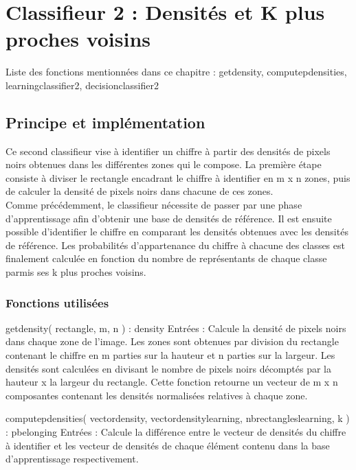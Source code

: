 \section{Classifieur 2 : Densités et K plus proches voisins}
Liste des fonctions mentionnées dans ce chapitre : getdensity, computepdensities, learningclassifier2, decisionclassifier2

\subsection{Principe et implémentation}

Ce second classifieur vise à identifier un chiffre à partir des densités de pixels noirs obtenues dans les différentes zones qui le compose. La première étape consiste à diviser le rectangle encadrant le chiffre à identifier en m x n zones, puis de calculer la densité de pixels noirs dans chacune de ces zones.\\

Comme précédemment, le classifieur nécessite de passer par une phase d'apprentissage afin d'obtenir une base de densités de référence. Il est ensuite possible d'identifier le chiffre en comparant les densités obtenues avec les densités de référence. Les probabilités d'appartenance du chiffre à chacune des classes est finalement calculée en fonction du nombre de représentants de chaque classe parmis ses k plus proches voisins.

\subsubsection{Fonctions utilisées}

getdensity( rectangle, m, n ) : density
Entrées :
Calcule la densité de pixels noirs dans chaque zone de l'image. Les zones sont obtenues par division du rectangle contenant le chiffre en m parties sur la hauteur et n parties sur la largeur. Les densités sont calculées en divisant le nombre de pixels noirs décomptés par la hauteur x la largeur du rectangle.
Cette fonction retourne un vecteur de m x n composantes contenant les densités normalisées relatives à chaque zone.

computepdensities( vectordensity, vectordensitylearning, nbrectangleslearning, k ) : pbelonging
Entrées : 
Calcule la différence entre le vecteur de densités du chiffre à identifier et les vecteur de densités de chaque élément contenu dans la base d'apprentissage respectivement.



